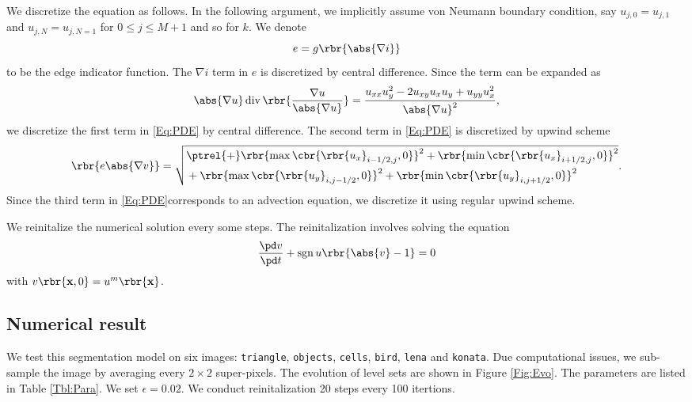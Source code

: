 \documentclass[english, nochinese]{pnote}
\DeclareMathOperator\opdiv{\mathrm{div}}
\DeclareMathOperator\opsgn{\mathrm{sgn}}
\begin{document}
We discretize the equation as follows. In the following argument, we implicitly assume von Neumann boundary condition, say $ u_{ j, 0 } = u_{ j, 1 } $ and $ u_{ j, N } = u_{ j, N = 1 } $ for $ 0 \le j \le M + 1 $ and so for $k$. We denote
\begin{equation}
e = g \rbr{\abs{ \nabla i }}
\end{equation}
to be the edge indicator function. The $ \nabla i $ term in $e$ is discretized by central difference. Since the term can be expanded as
\begin{equation}
\abs{ \nabla u } \opdiv \rbr{\frac{ \nabla u }{\abs{ \nabla u }}} = \frac{ u_{ x x } u_y^2 - 2 u_{ x y } u_x u_y + u_{ y y } u_x^2 }{\abs{ \nabla u }^2},
\end{equation}
we discretize the first term in \eqref{Eq:PDE} by central difference. The second term in \eqref{Eq:PDE} is discretized by upwind scheme
\begin{equation}
\rbr{ e \abs{ \nabla v } } = \sqrt{
\begin{aligned}
&\ptrel{+} \rbr{ \max \cbr{ \rbr{u_x}_{ i - 1 / 2, j }, 0 } }^2 + \rbr{ \min \cbr{ \rbr{u_x}_{ i + 1 / 2, j }, 0 } }^2 \\
&+ \rbr{ \max \cbr{ \rbr{u_y}_{ i, j - 1 / 2 }, 0 } }^2 + \rbr{ \min \cbr{ \rbr{u_y}_{ i, j + 1 / 2 }, 0 } }^2
\end{aligned}
}.
\end{equation}
Since the third term in \eqref{Eq:PDE}corresponds to an advection equation, we discretize it using regular upwind scheme.

We reinitalize the numerical solution every some steps. The reinitalization involves solving the equation
\begin{equation}
\frac{ \pd v }{ \pd t } + \opsgn u \rbr{ \abs{v} - 1 } = 0
\end{equation}
with $ v \rbr{ \mathbf{x}, 0 } = u^m \rbr{\mathbf{x}} $.

\subsection{Numerical result}

We test this segmentation model on six images: \verb"triangle", \verb"objects", \verb"cells", \verb"bird", \verb"lena" and \verb"konata". Due computational issues, we sub-sample the image by averaging every $ 2 \times 2 $ super-pixels. The evolution of level sets are shown in Figure \ref{Fig:Evo}. The parameters are listed in Table \ref{Tbl:Para}. We set $ \epsilon = 0.02 $. We conduct reinitalization 20 steps every 100 itertions.
\end{document}

